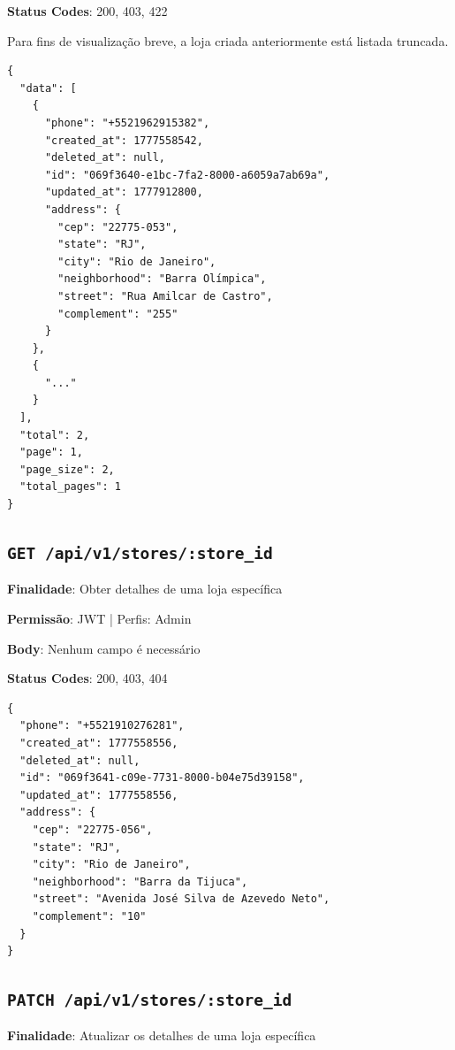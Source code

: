 \noindent\textbf{Status Codes}: 200, 403, 422

\begin{tcolorbox}[colback=green!5, colframe=black, title=\textbf{200 OK}]
Para fins de visualização breve, a loja criada anteriormente está listada truncada.
\begin{verbatim}
{
  "data": [
    {
      "phone": "+5521962915382",
      "created_at": 1777558542,
      "deleted_at": null,
      "id": "069f3640-e1bc-7fa2-8000-a6059a7ab69a",
      "updated_at": 1777912800,
      "address": {
        "cep": "22775-053",
        "state": "RJ",
        "city": "Rio de Janeiro",
        "neighborhood": "Barra Olímpica",
        "street": "Rua Amilcar de Castro",
        "complement": "255"
      }
    },
    {
      "..."
    }
  ],
  "total": 2,
  "page": 1,
  "page_size": 2,
  "total_pages": 1
}
\end{verbatim}
\end{tcolorbox}

\subsection{\texttt{GET /api/v1/stores/:store\_id}}

\noindent\textbf{Finalidade}: Obter detalhes de uma loja específica

\noindent\textbf{Permissão}: JWT | Perfis: Admin

\noindent\textbf{Body}: Nenhum campo é necessário

\noindent\textbf{Status Codes}: 200, 403, 404

\begin{tcolorbox}[colback=green!5, colframe=black, title=\textbf{200 OK}]
\begin{verbatim}
{
  "phone": "+5521910276281",
  "created_at": 1777558556,
  "deleted_at": null,
  "id": "069f3641-c09e-7731-8000-b04e75d39158",
  "updated_at": 1777558556,
  "address": {
    "cep": "22775-056",
    "state": "RJ",
    "city": "Rio de Janeiro",
    "neighborhood": "Barra da Tijuca",
    "street": "Avenida José Silva de Azevedo Neto",
    "complement": "10"
  }
}
\end{verbatim}
\end{tcolorbox}

\subsection{\texttt{PATCH /api/v1/stores/:store\_id}}

\noindent\textbf{Finalidade}: Atualizar os detalhes de uma loja específica

